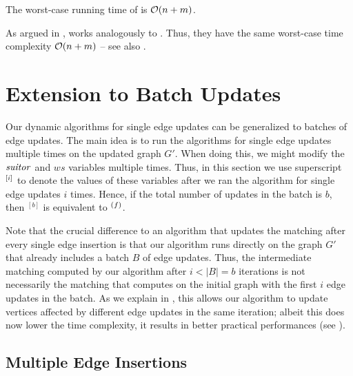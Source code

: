 \begin{proposition}
\label{prop:dyn-mwm:edge-removal-time}
The worst-case running time of  is $\mathcal{O}(n + m)$.
\end{proposition}

As argued in , 
works analogously to . Thus, they have the
same worst-case time complexity $\mathcal{O}(n + m)$ -- see also
.

\section{Extension to Batch Updates}
\label{sec:dyn-mwm:multiple-edge-updates}
%
Our dynamic algorithms for single edge updates can be generalized to batches of
edge updates. The main idea is to run the algorithms for single edge updates
multiple times on the updated graph $G'$. When doing this, we might modify the
$\mathit{suitor}$ and $ws$ variables multiple times. Thus, in this section we use
superscript $^{[i]}$ to denote the values of these variables after we ran the
algorithm for single edge updates $i$ times. Hence, if the total number of
updates in the batch is $b$, then $^{[b]}$ is equivalent to $^{(f)}$.

Note that the crucial difference to an algorithm that updates the matching
after every single edge insertion is that our algorithm runs directly on the
graph $G'$ that already includes a batch $B$ of edge updates.
%
%
Thus, the intermediate matching computed by our algorithm after $i < |B| = b$
iterations is not necessarily the matching that \suitor computes on the initial graph
with the first $i$ edge updates in the batch.
As we explain in
, this
allows our algorithm to update vertices affected by different edge updates in
the same iteration; albeit this does now lower the time complexity, it results
in better practical performances (see ).

\subsection{Multiple Edge Insertions}
\label{sec:dyn-mwm:multiple-insertions}



